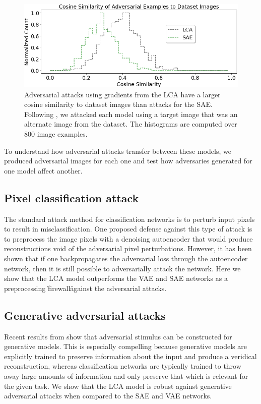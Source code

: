 \begin{figure}\label{fig:ch4_cosine_similarity}
\begin{center}
\centerline{\includegraphics[width=\columnwidth]{figures/cosyne_similarity.png}}
\end{center}
\caption{Adversarial attacks using gradients from the LCA have a larger cosine similarity to dataset images than attacks for the SAE. Following \parencite{kos2018adversarial}, we attacked each model using a target image that was an alternate image from the dataset. The histograms are computed over 800 image examples.}
\end{figure}

To understand how adversarial attacks transfer between these models, we produced adversarial images for each one and test how adversaries generated for one model affect another.


\subsection{Pixel classification attack}
The standard attack method for classification networks is to perturb input pixels to result in misclassification. One proposed defense against this type of attack is to preprocess the image pixels with a denoising autoencoder that would produce reconstructions void of the adversarial pixel perturbations. However, it has been shown that if one backpropagates the adversarial loss through the autoencoder network, then it is still possible to adversarially attack the network. Here we show that the LCA model outperforms the VAE and SAE networks as a preprocessing \"firewall\" against the adversarial attacks.

\subsection{Generative adversarial attacks}
Recent results from \citet{kos2018adversarial} show that adversarial stimulus can be constructed for generative models. This is especially compelling because generative models are explicitly trained to preserve information about the input and produce a veridical reconstruction, whereas classification networks are typically trained to throw away large amounts of information and only preserve that which is relevant for the given task. We show that the LCA model is robust against generative adversarial attacks when compared to the SAE and VAE networks.

